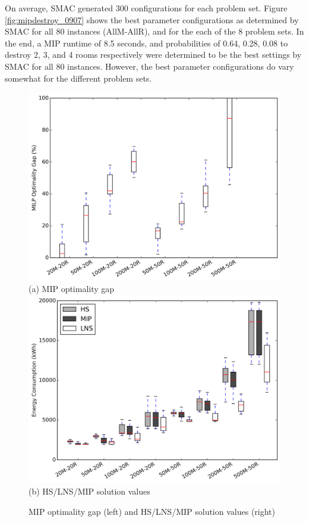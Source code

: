 On average, SMAC generated 300 configurations for each problem set. Figure \ref{fig:mipdestroy_0907} shows the best parameter configurations as determined by SMAC for all 80 instances (AllM-AllR), and for the each of the 8 problem sets. In the end, a MIP runtime of 8.5 seconds, and probabilities of 0.64, 0.28, 0.08 to destroy 2, 3, and 4 rooms respectively were determined to be the best settings by SMAC for all 80 instances. However, the best parameter configurations do vary somewhat for the different problem sets.

\begin{figure}
	\centering
		\includegraphics[width=0.9\linewidth]{figs/mip_optgap_maxdata500.png} \\
(a) MIP optimality gap \\[6pt]
		\includegraphics[width=0.9\linewidth]{figs/lnsmip_mspec_mspec900_shortHS_box_maxdata500.png}\\
(b) HS/LNS/MIP solution values \\[6pt]
	\caption{MIP optimality gap (left) and HS/LNS/MIP solution values (right)}
	\label{fig:optgap}
\end{figure}

